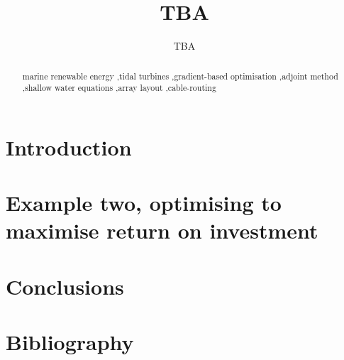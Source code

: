 \documentclass[authoryear]{elsarticle}
\title{TBA}
\author{TBA}
\begin{document}
\begin{frontmatter}

\begin{abstract}

\begin{keyword}
marine renewable energy \sep tidal turbines \sep gradient-based optimisation \sep adjoint method \sep shallow water equations \sep array layout \sep cable-routing
\end{keyword}

\end{abstract}

\end{frontmatter}

\section{Introduction}

\section{Example two, optimising to maximise return on investment} \label{sec:EX2.1}


\section{Conclusions}





\section{Bibliography}



\end{document}
